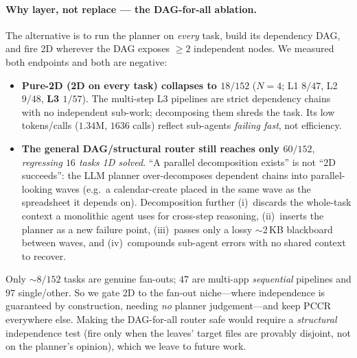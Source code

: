 \documentclass[10pt,twocolumn]{article}
\begin{document}
\paragraph{Why layer, not replace --- the DAG-for-all ablation.} The alternative is to run the planner
on \emph{every} task, build its dependency DAG, and fire 2D wherever the DAG exposes $\ge 2$
independent nodes. We measured both endpoints and both are negative:
\begin{itemize}
\item \textbf{Pure-2D (2D on every task) collapses to $18/152$} ($N{=}4$; L1 $8/47$, L2 $9/48$,
\textbf{L3 $1/57$}). The multi-step L3 pipelines are strict dependency chains with no independent
sub-work; decomposing them shreds the task. Its low tokens/calls ($1.34$M, $1636$ calls) reflect
sub-agents \emph{failing fast}, not efficiency.
\item \textbf{The general DAG/structural router still reaches only $60/152$}, \emph{regressing $16$
tasks 1D solved}. ``A parallel decomposition exists'' is not ``2D succeeds'': the LLM planner
over-decomposes dependent chains into parallel-looking waves (e.g.\ a calendar-create placed in the
same wave as the spreadsheet it depends on). Decomposition further (i)~discards the whole-task context
a monolithic agent uses for cross-step reasoning, (ii)~inserts the planner as a new failure point,
(iii)~passes only a lossy $\sim$2\,KB blackboard between waves, and (iv)~compounds sub-agent errors
with no shared context to recover.
\end{itemize}
Only ${\sim}8/152$ tasks are genuine fan-outs; $47$ are multi-app \emph{sequential} pipelines and $97$
single/other. So we gate 2D to the fan-out niche---where independence is guaranteed by construction,
needing \emph{no} planner judgement---and keep PCCR everywhere else. Making the DAG-for-all router safe
would require a \emph{structural} independence test (fire only when the leaves' target files are
provably disjoint, not on the planner's opinion), which we leave to future work.
\end{document}
